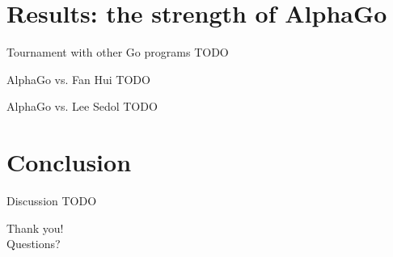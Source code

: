 \documentclass{beamer}
\newcommand{\todo}{\alert{TODO}}
\begin{document}
  \section{Results: the strength of AlphaGo}

  \begin{frame}{Tournament with other Go programs}
    \todo
  \end{frame}

  \begin{frame}{AlphaGo vs. Fan Hui}
    \todo
  \end{frame}

  \begin{frame}{AlphaGo vs. Lee Sedol}
    \todo
  \end{frame}


  \section{Conclusion}

  \begin{frame}{Discussion}
    \todo
  \end{frame}

  \begin{frame}
    \begin{center}
      Thank you! \\
      Questions?
    \end{center}
  \end{frame}
\end{document}
